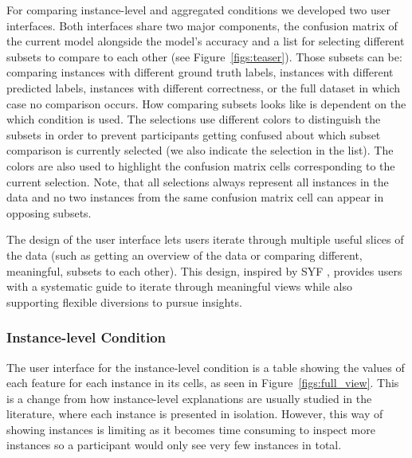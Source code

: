 For comparing instance-level and aggregated conditions we developed two user interfaces.
Both interfaces share two major components,
the confusion matrix of the current model alongside the model's accuracy and a list for selecting different subsets to compare to each other (see Figure~\ref{figs:teaser}).
Those subsets can be: comparing instances with different ground truth labels, instances with different predicted labels, instances with different correctness, or the full dataset in which case no comparison occurs.
How comparing subsets looks like is dependent on the which condition is used.
The selections use different colors to distinguish the subsets in order to prevent participants getting confused about which subset comparison is currently selected (we also indicate the selection in the list).
The colors are also used to highlight the confusion matrix cells corresponding to the current selection.
Note, that all selections always represent all instances in the data and no two instances from the same confusion matrix cell can appear in opposing subsets.

The design of the user interface lets users iterate through multiple useful slices of the data (such as getting an overview of the data or comparing different, meaningful, subsets to each other).
This design, inspired by SYF \cite{perer2008systematic}, provides users with a systematic guide to iterate through meaningful views while also supporting flexible diversions to pursue insights.

\subsubsection{Instance-level Condition}
The user interface for the instance-level condition is a table showing the values of each feature for each instance in its cells, as seen in Figure~\ref{figs:full_view}.
This is a change from how instance-level explanations are usually studied in the literature, where each instance is presented in isolation.
However, this way of showing instances is limiting as it becomes time consuming to inspect more instances so a participant would only see very few instances in total.

